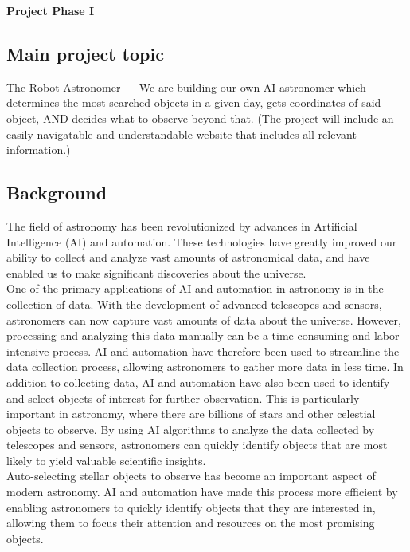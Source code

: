 \documentclass[12pt,letterpaper]{article}
\begin{document}
  \thispagestyle{firstpagestyle}
  \begin{center}
    {\huge \textbf{Project Phase I}}
  \end{center}

    
\subsection*{Main project topic}
The Robot Astronomer — We are building our own AI astronomer which determines the most searched objects in a given day, gets 
coordinates of said object, AND decides what to observe beyond that. (The project will include an easily navigatable and 
understandable website that includes all relevant information.)

\subsection*{Background}
The field of astronomy has been revolutionized by advances in Artificial Intelligence 
(AI) and automation. These technologies have greatly improved our ability to collect 
and analyze vast amounts of astronomical data, and have enabled us to make significant 
discoveries about the universe.\\

One of the primary applications of AI and automation in astronomy is in the collection 
of data. With the development of advanced telescopes and sensors, astronomers can now 
capture vast amounts of data about the universe. However, processing and analyzing 
this data manually can be a time-consuming and labor-intensive process. AI and automation 
have therefore been used to streamline the data collection process, allowing astronomers 
to gather more data in less time. In addition to collecting data, AI and automation have 
also been used to identify and select objects of interest for further observation. 
This is particularly important in astronomy, where there are billions of stars and 
other celestial objects to observe. By using AI algorithms to analyze the data collected 
by telescopes and sensors, astronomers can quickly identify objects that are most likely 
to yield valuable scientific insights.\\

Auto-selecting stellar objects to observe has become an important aspect of modern 
astronomy. AI and automation have made this process more efficient by enabling astronomers 
to quickly identify objects that they are interested in, allowing them to focus their 
attention and resources on the most promising objects.\\
\end{document}
